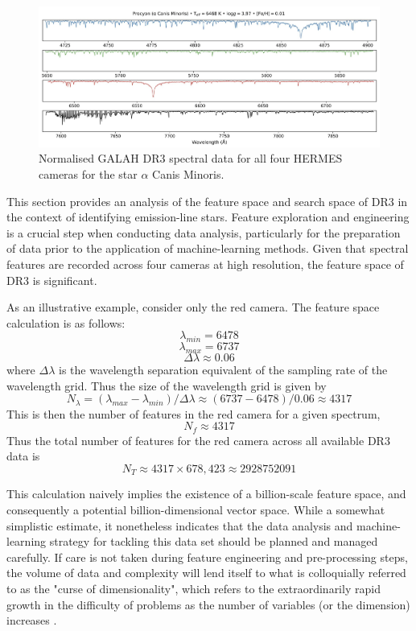 \begin{figure}[!htb]
\centering
\includegraphics[scale=.25]{figures/galah cameras.jpeg}
\caption{Normalised GALAH DR3 spectral data for all four HERMES cameras for the star $\alpha$ Canis Minoris.}
\end{figure}

This section provides an analysis of the feature space and search space of DR3 in the context of identifying emission-line stars. Feature exploration and engineering is a crucial step when conducting data analysis, particularly for the preparation of data prior to the application of machine-learning methods. Given that spectral features are recorded across four cameras at high resolution, the feature space of DR3 is significant. 

As an illustrative example, consider only the red camera. The feature space calculation is as follows:
\[\lambda_{min} = 6478\]
\[\lambda_{max} = 6737\]
\[\Delta\lambda \approx 0.06\]
where $\Delta\lambda$ is the wavelength separation equivalent of the sampling rate of the wavelength grid. Thus the size of the wavelength grid is given by \[N_{\lambda} = (\lambda_{max}-\lambda_{min})/\Delta\lambda \approx (6737-6478)/0.06 \approx 4317\]
This is then the number of features in the red camera for a given spectrum, \[N_{f} \approx 4317\]
Thus the total number of features for the red camera across all available DR3 data is \[N_{T} \approx 4317\times678,423 \approx \num[round-precision=2,round-mode=figures,
     scientific-notation=true]{2928752091}\]

This calculation naively implies the existence of a billion-scale feature space, and consequently a potential billion-dimensional vector space. While a somewhat simplistic estimate, it nonetheless indicates that the data analysis and machine-learning strategy for tackling this data set should be planned and managed carefully. If care is not taken during feature engineering and pre-processing steps, the volume of data and complexity will lend itself to what is colloquially referred to as the "curse of dimensionality", which refers to the extraordinarily rapid growth in the difficulty of problems as the number of variables (or the dimension) increases \citep{kuo2005lifting}.

